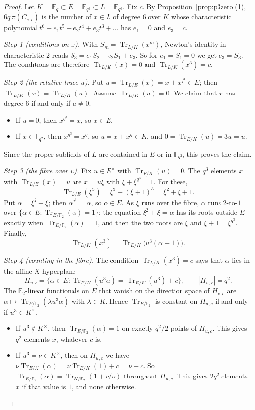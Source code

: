 \documentclass[11pt,a4paper]{amsart}
\theoremstyle{definition}
\theoremstyle{remark}
\newcommand{\F}{\mathbb{F}}
\newcommand{\Tr}{\operatorname{Tr}}
\begin{document}
\begin{proof}
Let $K=\F_q\subset E=\F_{q^3}\subset L=\F_{q^6}$. Fix $c$. By Proposition~\ref{prop:p3zero}(1), $6q\,\pi(C_{e,c})$ is the number
of $x\in L$ of degree $6$ over $K$ whose characteristic polynomial $t^6+e_1t^5+e_2t^4+e_3t^3+\dots$ has $e_1=0$ and
$e_3=c$.

\emph{Step 1 (conditions on $x$).} With $S_m=\Tr_{L/K}(x^m)$, Newton's identity in characteristic $2$ reads
$S_3=e_1S_2+e_2S_1+e_3$. So for $e_1=S_1=0$ we get $e_3=S_3$. The conditions are therefore
$\Tr_{L/K}(x)=0$ and $\Tr_{L/K}(x^3)=c$.

\emph{Step 2 (the relative trace $u$).} Put $u=\Tr_{L/E}(x)=x+x^{q^3}\in E$; then $\Tr_{L/K}(x)=\Tr_{E/K}(u)$. Assume
$\Tr_{E/K}(u)=0$. We claim that $x$ has degree $6$ if and only if $u\ne0$.
\begin{itemize}
\item If $u=0$, then $x^{q^3}=x$, so $x\in E$.
\item If $x\in\F_{q^2}$, then $x^{q^3}=x^q$, so $u=x+x^q\in K$, and $0=\Tr_{E/K}(u)=3u=u$.
\end{itemize}
Since the proper subfields of $L$ are contained in $E$ or in $\F_{q^2}$, this proves the claim.

\emph{Step 3 (the fibre over $u$).} Fix $u\in E^\times$ with $\Tr_{E/K}(u)=0$. The $q^3$ elements $x$ with
$\Tr_{L/E}(x)=u$ are $x=u\xi$ with $\xi+\xi^{q^3}=1$. For these,
\[
\Tr_{L/E}(\xi^3)=\xi^3+(\xi+1)^3=\xi^2+\xi+1 .
\]
Put $\alpha=\xi^2+\xi$; then $\alpha^{q^3}=\alpha$, so $\alpha\in E$. As $\xi$ runs over the fibre, $\alpha$ runs
$2$-to-$1$ over $\{\alpha\in E:\Tr_{E/\F_2}(\alpha)=1\}$: the equation $\xi^2+\xi=\alpha$ has its roots outside $E$
exactly when $\Tr_{E/\F_2}(\alpha)=1$, and then the two roots are $\xi$ and $\xi+1=\xi^{q^3}$. Finally,
\[
\Tr_{L/K}(x^3)=\Tr_{E/K}\bigl(u^3(\alpha+1)\bigr).
\]

\emph{Step 4 (counting in the fibre).} The condition $\Tr_{L/K}(x^3)=c$ says that $\alpha$ lies in the affine
$K$-hyperplane
\[
H_{u,c}=\{\alpha\in E:\Tr_{E/K}(u^3\alpha)=\Tr_{E/K}(u^3)+c\},\qquad |H_{u,c}|=q^2 .
\]
The $\F_2$-linear functionals on $E$ that vanish on the direction space of $H_{u,c}$ are
$\alpha\mapsto\Tr_{E/\F_2}(\lambda u^3\alpha)$ with $\lambda\in K$. Hence $\Tr_{E/\F_2}$ is constant on $H_{u,c}$ if
and only if $u^3\in K^\times$.
\begin{itemize}
\item If $u^3\notin K^\times$, then $\Tr_{E/\F_2}(\alpha)=1$ on exactly $q^2/2$ points of $H_{u,c}$. This gives
$q^2$ elements $x$, whatever $c$ is.
\item If $u^3=\nu\in K^\times$, then on $H_{u,c}$ we have $\nu\Tr_{E/K}(\alpha)=\nu\Tr_{E/K}(1)+c=\nu+c$. So
$\Tr_{E/\F_2}(\alpha)=\Tr_{K/\F_2}(1+c/\nu)$ throughout $H_{u,c}$. This gives $2q^2$ elements $x$ if that value is
$1$, and none otherwise.
\end{itemize}


\end{proof}
\end{document}
